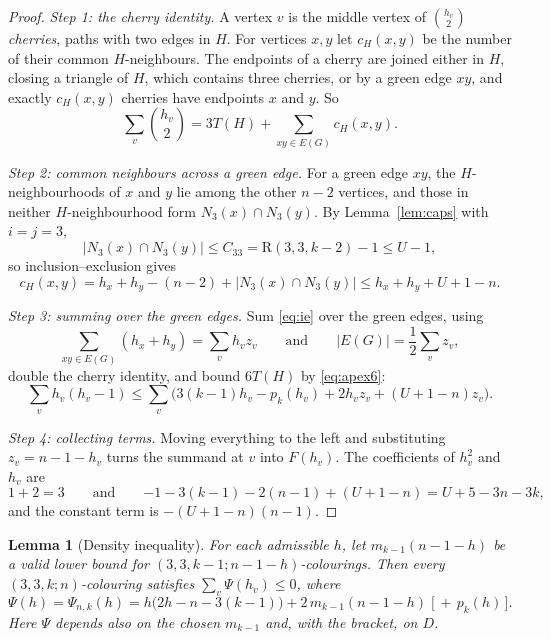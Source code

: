 \documentclass[11pt]{article}
\theoremstyle{spacedplain}
\newtheorem{lemma}[theorem]{Lemma}
\theoremstyle{spaceddef}
\theoremstyle{spacedremark}
\newcommand{\R}{\mathrm{R}}
\begin{document}
\begin{proof}
\emph{Step 1: the cherry identity.}
A vertex $v$ is the middle vertex of $\binom{h_v}{2}$ \emph{cherries}, paths with two edges in $H$.
For vertices $x,y$ let $c_H(x,y)$ be the number of their common $H$-neighbours.
The endpoints of a cherry are joined either in $H$, closing a triangle of $H$, which contains three cherries, or by a green edge $xy$, and exactly $c_H(x,y)$ cherries have endpoints $x$ and $y$.
So
\[
\sum_v\binom{h_v}{2}=3T(H)+\sum_{xy\in E(G)}c_H(x,y).
\]

\emph{Step 2: common neighbours across a green edge.}
For a green edge $xy$, the $H$-neighbourhoods of $x$ and $y$ lie among the other $n-2$ vertices, and those in neither $H$-neighbourhood form $N_3(x)\cap N_3(y)$.
By Lemma~\ref{lem:caps} with $i=j=3$,
\[
|N_3(x)\cap N_3(y)|\le C_{33}=\R(3,3,k-2)-1\le U-1,
\]
so inclusion--exclusion gives
\begin{equation}\label{eq:ie}
c_H(x,y)=h_x+h_y-(n-2)+|N_3(x)\cap N_3(y)|\le h_x+h_y+U+1-n.
\end{equation}

\emph{Step 3: summing over the green edges.}
Sum \eqref{eq:ie} over the green edges, using
\[
\sum_{xy\in E(G)}(h_x+h_y)=\sum_vh_vz_v\qquad\text{and}\qquad|E(G)|=\frac12\sum_vz_v,
\]
double the cherry identity, and bound $6T(H)$ by \eqref{eq:apex6}:
\[
\sum_vh_v(h_v-1)\le\sum_v\big(3(k-1)h_v-p_k(h_v)+2h_vz_v+(U+1-n)z_v\big).
\]

\emph{Step 4: collecting terms.}
Moving everything to the left and substituting $z_v=n-1-h_v$ turns the summand at $v$ into $F(h_v)$.
The coefficients of $h_v^2$ and $h_v$ are
\[
1+2=3\qquad\text{and}\qquad{-1}-3(k-1)-2(n-1)+(U+1-n)=U+5-3n-3k,
\]
and the constant term is $-(U+1-n)(n-1)$.
\end{proof}

\begin{lemma}[Density inequality]\label{lem:density}
For each admissible $h$, let $m_{k-1}(n-1-h)$ be a valid lower bound for $(3,3,k-1;n-1-h)$-colourings.
Then every $(3,3,k;n)$-colouring satisfies $\sum_v\Psi(h_v)\le 0$, where
\[
\Psi(h)=\Psi_{n,k}(h)=h\big(2h-n-3(k-1)\big)+2\,m_{k-1}(n-1-h)\;\big[\,+\,p_k(h)\,\big].
\]
Here $\Psi$ depends also on the chosen $m_{k-1}$ and, with the bracket, on $D$.
\end{lemma}
\end{document}

